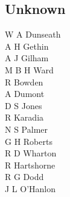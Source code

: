 \begin{multicols}{3}
  \subsection*{Unknown}
  W A Dunseath \\
  A H Gethin \\
  A J Gilham \\
  M B H Ward \\
  R Bowden \\
  A Dumont \\
  D S Jones \\
  R Karadia \\
  N S Palmer \\
  G H Roberts \\
  R D Wharton \\
  R Hartshorne \\
  R G Dodd \\
  J L O'Hanlon \\
\end{multicols}
